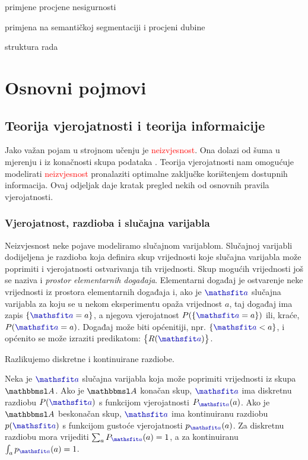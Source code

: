\documentclass[utf8, diplomski, lmodern]{fer}
\begin{document}
primjene procjene nesigurnosti

primjena na semantičkoj segmentaciji i procjeni dubine

struktura rada



\chapter{Osnovni pojmovi} \label{chap:osnovni-pojmovi}


\section{Teorija vjerojatnosti i teorija informaicije}

Jako važan pojam u strojnom učenju je \textcolor{red}{neizvjesnost}. Ona dolazi od šuma u mjerenju i iz konačnosti skupa podataka \citep{Bishop:2006:PRML}. Teorija vjerojatnosti nam omogućuje modelirati \textcolor{red}{neizvjesnost} pronalaziti optimalne zaključke korištenjem dostupnih informacija. Ovaj odjeljak daje kratak pregled nekih od osnovnih pravila vjerojatnosti.

\subsection{Vjerojatnost, razdioba i slučajna varijabla}

Neizvjesnost neke pojave modeliramo slučajnom varijablom. Slučajnoj varijabli dodijeljena je razdioba koja definira skup vrijednosti koje slučajna varijabla može poprimiti i vjerojatnosti ostvarivanja tih vrijednosti. Skup mogućih vrijednosti još se naziva i \emph{prostor elementarnih događaja}. Elementarni događaj je ostvarenje neke vrijednosti iz prostora elementarnih događaja i, ako je $\rvar a$ slučajna varijabla za koju se u nekom eksperimentu opaža vrijednost $a$, taj događaj ima zapis $\cbr{\rvar a = a}$, a njegova vjerojatnost $P(\cbr{\rvar a = a})$ ili, kraće, $P(\rvar a = a)$. Događaj može biti općenitiji, npr. $\cbr{\rvar a < a}$, i općenito se može izraziti predikatom: $\cbr{R(\rvar a)}$.

Razlikujemo diskretne i kontinuirane razdiobe. 

Neka je $\rvar a$ slučajna varijabla koja može poprimiti vrijednosti iz skupa $\set A$. Ako je $\set A$ konačan skup, $\rvar a$ ima diskretnu razdiobu $P(\rvar a)$ s funkcijom vjerojatnosti $P_{\rvar a}(a)$. Ako je $\set A$ beskonačan skup, $\rvar a$ ima kontinuiranu razdiobu $p(\rvar a)$ s funkcijom gustoće vjerojatnosti $p_{\rvar a}(a)$. Za diskretnu razdiobu mora vrijediti $\sum_a P_{\rvar a}(a)=1$, a za kontinuiranu $\int_a p_{\rvar a}(a)=1$.
\end{document}

